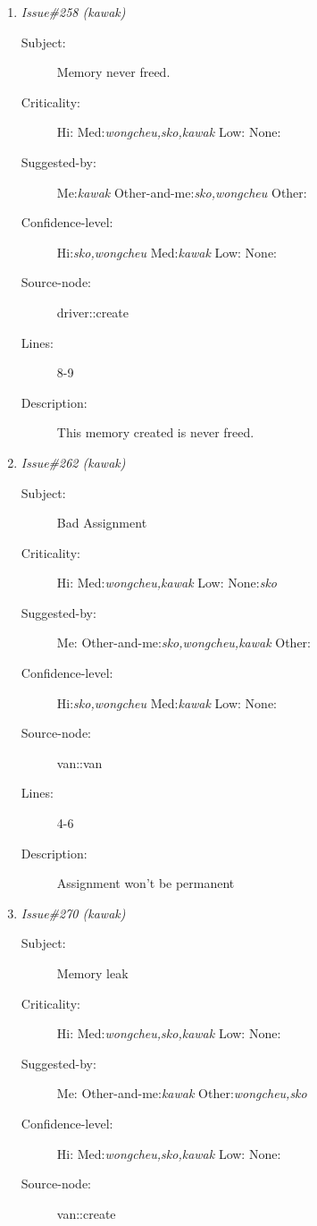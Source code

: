 \begin{enumerate}
\begin{description}
\item [Lines:] 7-8

\item [Description:] Because trash\_veh is initialized to zero, this loop which accepts user input
is never entered.
\end{description}
\item {\it Issue\#258 (kawak)}
\begin{description}
\item [Subject:] Memory never freed.
\item [Criticality:] Hi:{\it } Med:{\it wongcheu,sko,kawak} Low:{\it } None:{\it }
\item [Suggested-by:] Me:{\it kawak} Other-and-me:{\it sko,wongcheu} Other:{\it }
\item [Confidence-level:] Hi:{\it sko,wongcheu} Med:{\it kawak} Low:{\it } None:{\it }
\item [Source-node:] driver::create

\item [Lines:] 8-9

\item [Description:] This memory created is never freed.
\end{description}
\item {\it Issue\#262 (kawak)}
\begin{description}
\item [Subject:] Bad Assignment
\item [Criticality:] Hi:{\it } Med:{\it wongcheu,kawak} Low:{\it } None:{\it sko}
\item [Suggested-by:] Me:{\it } Other-and-me:{\it sko,wongcheu,kawak} Other:{\it }
\item [Confidence-level:] Hi:{\it sko,wongcheu} Med:{\it kawak} Low:{\it } None:{\it }
\item [Source-node:] van::van

\item [Lines:] 4-6

\item [Description:] Assignment won't be permanent
\end{description}
\item {\it Issue\#270 (kawak)}
\begin{description}
\item [Subject:] Memory leak
\item [Criticality:] Hi:{\it } Med:{\it wongcheu,sko,kawak} Low:{\it } None:{\it }
\item [Suggested-by:] Me:{\it } Other-and-me:{\it kawak} Other:{\it wongcheu,sko}
\item [Confidence-level:] Hi:{\it } Med:{\it wongcheu,sko,kawak} Low:{\it } None:{\it }
\item [Source-node:] van::create


\end{description}
\end{enumerate}
